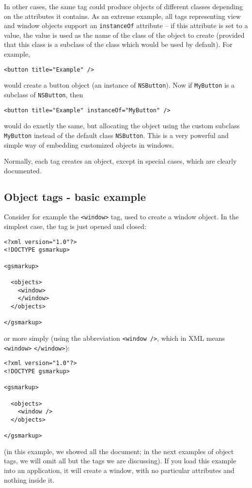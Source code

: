 In other cases, the same tag could produce objects of different
classes depending on the attributes it contains.  As an extreme
example, all tags representing view and window objects support an
\texttt{instanceOf} attribute -- if this attribute is set to a value, 
the value is used as the name of the class of the object to create
(provided that this class is a subclass of the class which would be
used by default).  For example,
\begin{verbatim}
<button title="Example" />
\end{verbatim}
would create a button object (an instance of \texttt{NSButton}).  Now
if \texttt{MyButton} is a subclass of \texttt{NSButton}, then
\begin{verbatim}
<button title="Example" instanceOf="MyButton" />
\end{verbatim}
would do exactly the same, but allocating the object using the custom
subclass \texttt{MyButton} instead of the default class
\texttt{NSButton}.  This is a very powerful and simple way of embedding 
customized objects in windows.

Normally, each tag creates an object, except in special cases, which
are clearly documented.

\subsection{Object tags - basic example}
Consider for example the \texttt{<window>} tag, used to create a
window object.  In the simplest case, the tag is just opened and
closed:
\begin{verbatim}
<?xml version="1.0"?>
<!DOCTYPE gsmarkup>

<gsmarkup>

  <objects>
    <window>
    </window>
  </objects>

</gsmarkup>
\end{verbatim}
or more simply (using the abbreviation \texttt{<window />}, 
which in XML means \texttt{<window>} \texttt{</window>}):
\begin{verbatim}
<?xml version="1.0"?> 
<!DOCTYPE gsmarkup>

<gsmarkup>

  <objects>
    <window />
  </objects>

</gsmarkup>
\end{verbatim}
(in this example, we showed all the document; in the next examples of
object tags, we will omit all but the tags we are discussing).  If you
load this example into an application, it will create a window, with
no particular attributes and nothing inside it.

